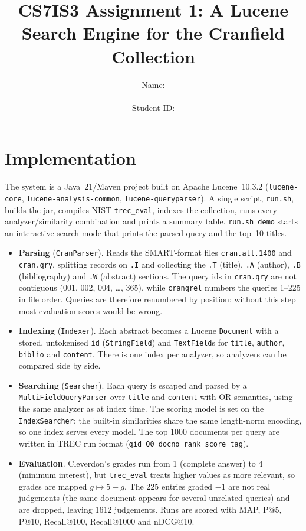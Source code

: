 \documentclass[10pt,a4paper]{article}
\title{\vspace{-1.2cm}\textbf{CS7IS3 Assignment 1: A Lucene Search Engine for the Cranfield Collection}}
\author{Name: \rule{4cm}{0.4pt} \qquad Student ID: \rule{3cm}{0.4pt}}
\date{\vspace{-0.6cm}}
\newcommand{\code}[1]{\texttt{\small #1}}
\begin{document}
\maketitle

\section{Implementation}

The system is a Java~21/Maven project built on Apache Lucene~10.3.2
(\code{lucene-core}, \code{lucene-analysis-common}, \code{lucene-queryparser}).
A single script, \code{run.sh}, builds the jar, compiles NIST \code{trec\_eval}, indexes the
collection, runs every analyzer/similarity combination and prints a summary table.
\code{run.sh demo} starts an interactive search mode that prints the parsed query and the top~10 titles.

\begin{itemize}
  \item \textbf{Parsing} (\code{CranParser}). Reads the SMART-format files
  \code{cran.all.1400} and \code{cran.qry}, splitting records on \code{.I} and collecting the
  \code{.T} (title), \code{.A} (author), \code{.B} (bibliography) and \code{.W} (abstract)
  sections. The query ids in \code{cran.qry} are not contiguous (001, 002, 004, \dots, 365),
  while \code{cranqrel} numbers the queries 1--225 in file order. Queries are therefore
  renumbered by position; without this step most evaluation scores would be wrong.
  \item \textbf{Indexing} (\code{Indexer}). Each abstract becomes a Lucene \code{Document}
  with a stored, untokenised \code{id} (\code{StringField}) and \code{TextField}s for
  \code{title}, \code{author}, \code{biblio} and \code{content}. There is one index per
  analyzer, so analyzers can be compared side by side.
  \item \textbf{Searching} (\code{Searcher}). Each query is escaped and parsed by a
  \code{MultiFieldQueryParser} over \code{title} and \code{content} with OR semantics, using
  the same analyzer as at index time. The scoring model is set on the \code{IndexSearcher};
  the built-in similarities share the same length-norm encoding, so one index serves every
  model. The top 1000 documents per query are written in TREC run format
  (\code{qid Q0 docno rank score tag}).
  \item \textbf{Evaluation}. Cleverdon's grades run from 1 (complete answer) to 4 (minimum
  interest), but \code{trec\_eval} treats higher values as more relevant, so grades are mapped
  $g \mapsto 5-g$. The 225 entries graded $-1$ are not real judgements (the same document
  appears for several unrelated queries) and are dropped, leaving 1612 judgements. Runs are
  scored with MAP, P@5, P@10, Recall@100, Recall@1000 and nDCG@10.
\end{itemize}
\end{document}
